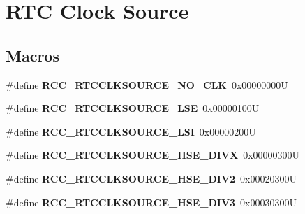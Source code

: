 \hypertarget{group___r_c_c___r_t_c___clock___source}{}\section{R\+TC Clock Source}
\label{group___r_c_c___r_t_c___clock___source}
\subsection*{Macros}
\begin{DoxyCompactItemize}
\item 
\mbox{\label{group___r_c_c___r_t_c___clock___source_gacce0b2f54d103340d8c3a218e86e295d}} 
\#define {\bfseries R\+C\+C\+\_\+\+R\+T\+C\+C\+L\+K\+S\+O\+U\+R\+C\+E\+\_\+\+N\+O\+\_\+\+C\+LK}~0x00000000U
\item 
\mbox{\label{group___r_c_c___r_t_c___clock___source_ga5dca8d63f250a20bd6bc005670d0c150}} 
\#define {\bfseries R\+C\+C\+\_\+\+R\+T\+C\+C\+L\+K\+S\+O\+U\+R\+C\+E\+\_\+\+L\+SE}~0x00000100U
\item 
\mbox{\label{group___r_c_c___r_t_c___clock___source_gab47a1afb8b5eef9f20f4772961d0a5f4}} 
\#define {\bfseries R\+C\+C\+\_\+\+R\+T\+C\+C\+L\+K\+S\+O\+U\+R\+C\+E\+\_\+\+L\+SI}~0x00000200U
\item 
\mbox{\label{group___r_c_c___r_t_c___clock___source_ga2e3715826835647795863c32f9aebad7}} 
\#define {\bfseries R\+C\+C\+\_\+\+R\+T\+C\+C\+L\+K\+S\+O\+U\+R\+C\+E\+\_\+\+H\+S\+E\+\_\+\+D\+I\+VX}~0x00000300U
\item 
\mbox{\label{group___r_c_c___r_t_c___clock___source_gac1ee63256acb5637e994abf629edaf3b}} 
\#define {\bfseries R\+C\+C\+\_\+\+R\+T\+C\+C\+L\+K\+S\+O\+U\+R\+C\+E\+\_\+\+H\+S\+E\+\_\+\+D\+I\+V2}~0x00020300U
\item 
\mbox{\label{group___r_c_c___r_t_c___clock___source_ga242119dd2fc5e6ec6d7c2aa239dbcb9f}} 
\#define {\bfseries R\+C\+C\+\_\+\+R\+T\+C\+C\+L\+K\+S\+O\+U\+R\+C\+E\+\_\+\+H\+S\+E\+\_\+\+D\+I\+V3}~0x00030300U
\item 

\end{DoxyCompactItemize}
